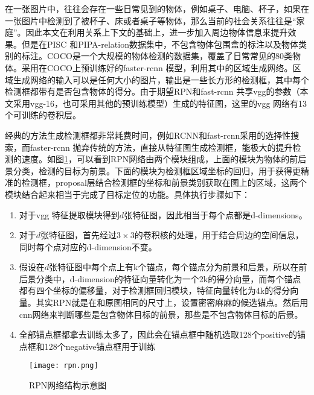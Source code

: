 在一张图片中，往往会存在一些日常见到的物体，例如桌子、电脑、杯子，如果在一张图片中检测到了被杯子、床或者桌子等物体，那么当前的社会关系往往是``家庭''。因此本文在利用关系上下文的基础上，进一步加入周边物体信息来提升效果。但是在PISC 和PIPA-relation数据集中，不包含物体包围盒的标注以及物体类别的标注。COCO\cite{lin2014microsoft}是一个大规模的物体检测的数据集，覆盖了日常常见的80类物体。采用在COCO上预训练好的faster-rcnn 模型，利用其中的区域生成网络。区域生成网络的输入可以是任何大小的图片，输出是一些长方形的检测框，其中每个检测框都带有是否包含物体的得分。由于期望RPN和fast-rcnn 共享vgg\cite{simonyan2015very}的参数（本文采用vgg-16，也可采用其他的预训练模型）生成的特征图，这里的vgg 网络有13个可训练的卷积层。

经典的方法生成检测框都非常耗费时间，例如RCNN和fast-rcnn采用的选择性搜索，而faster-rcnn 抛弃传统的方法，直接从特征图生成检测框，能极大的提升检测的速度。如图\ref{fig:rpn}，可以看到RPN网络由两个模块组成，上面的模块为物体的前后景分类，检测的目标为前景。下面的模块为检测框区域坐标的回归，用于获得更精准的检测框，proposal层结合检测框的坐标和前景类别获取在图上的区域，这两个模块结合起来相当于完成了目标定位的功能。具体执行步骤如下：
\begin{enumerate}
    \item 对于vgg 特征提取模块得到$d$张特征图，因此相当于每个点都是d-dimensions。
    \item 对于$d$张特征图，首先经过$3 \times 3$的卷积核的处理，用于结合周边的空间信息，同时每个点对应的d-dimension不变。
    \item 假设在$d$张特征图中每个点上有k个锚点，每个锚点分为前景和后景，所以在前后景分类中，d-dimension的特征向量转化为一个2k的得分向量，而每个锚点都有四个坐标的偏移量，对于检测框回归模块，特征向量转化为4k的得分向量。其实RPN就是在和原图相同的尺寸上，设置密密麻麻的候选锚点。然后用cnn网络来判断哪些是包含物体目标的前景，那些是不包含物体目标的后景。
    \item 全部锚点框都拿去训练太多了，因此会在锚点框中随机选取128个positive的锚点框和128个negative锚点框用于训练
\end{enumerate}
\begin{figure}[htpb]
	\centering
	\texttt{[image: rpn.png]}
    \caption{RPN网络结构示意图}
	\vspace*{-3.5mm}
	\label{fig:rpn}
\end{figure}
